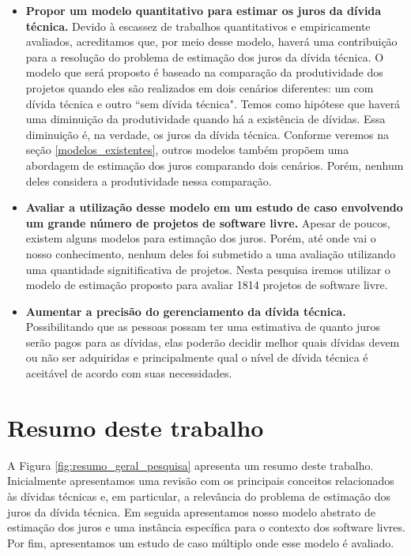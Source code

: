 \begin{itemize}
\item  \textbf{Propor um modelo quantitativo para estimar os juros da dívida técnica.} Devido à escassez de trabalhos quantitativos e empiricamente avaliados, acreditamos que, por meio desse modelo, haverá uma contribuição para a resolução do problema de estimação dos juros da dívida técnica. O modelo que será proposto é baseado na comparação da produtividade dos projetos quando eles são realizados em dois cenários diferentes: um com dívida técnica e outro ``sem dívida técnica". Temos como hipótese que haverá uma diminuição da produtividade quando há a existência de dívidas. Essa diminuição é, na verdade, os juros da dívida técnica. Conforme veremos na seção \ref{modelos_existentes}, outros modelos também propõem uma abordagem de estimação dos juros comparando dois cenários. Porém, nenhum deles considera a produtividade nessa comparação. 
\item  \textbf{Avaliar a utilização desse modelo em um estudo de caso envolvendo um grande número de projetos de software livre.} Apesar de poucos, existem alguns modelos para estimação dos juros. Porém, até onde vai o nosso conhecimento, nenhum deles foi submetido a uma avaliação utilizando uma quantidade signitificativa de projetos. Nesta pesquisa iremos utilizar o modelo de estimação proposto para avaliar 1814 projetos de software livre.
\item  \textbf{Aumentar a precisão do gerenciamento da dívida técnica.}  Possibilitando que as pessoas possam ter uma estimativa de quanto juros serão pagos para as dívidas, elas poderão decidir melhor quais dívidas devem ou não ser adquiridas e principalmente qual o nível de dívida técnica é aceitável de acordo com suas necessidades. 
\end{itemize}


\section{Resumo deste trabalho}
A Figura \ref{fig:resumo_geral_pesquisa} apresenta um resumo deste trabalho. Inicialmente apresentamos uma revisão com os principais conceitos relacionados às dívidas técnicas e, em particular, a relevância do problema de estimação dos juros da dívida técnica. Em seguida apresentamos nosso modelo abstrato de estimação dos juros e uma instância específica para o contexto dos software livres. Por fim, apresentamos um estudo de caso múltiplo onde esse modelo é avaliado. 



